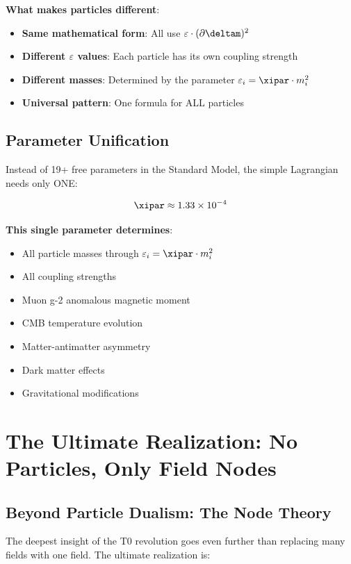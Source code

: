 	\textbf{What makes particles different}:
	\begin{itemize}
		\item \textbf{Same mathematical form}: All use $\varepsilon \cdot (\partial \deltam)^2$
		\item \textbf{Different $\varepsilon$ values}: Each particle has its own coupling strength
		\item \textbf{Different masses}: Determined by the parameter $\varepsilon_i = \xipar \cdot m_i^2$
		\item \textbf{Universal pattern}: One formula for ALL particles
	\end{itemize}
	
	\subsection{Parameter Unification}
	
	Instead of 19+ free parameters in the Standard Model, the simple Lagrangian needs only ONE:
	
	\begin{equation}
		\xipar \approx 1.33 \times 10^{-4}
		\label{eq:universal_parameter}
	\end{equation}
	
	\textbf{This single parameter determines}:
	\begin{itemize}
		\item All particle masses through $\varepsilon_i = \xipar \cdot m_i^2$
		\item All coupling strengths
		\item Muon g-2 anomalous magnetic moment
		\item CMB temperature evolution
		\item Matter-antimatter asymmetry
		\item Dark matter effects
		\item Gravitational modifications
	\end{itemize}
	
	\section{The Ultimate Realization: No Particles, Only Field Nodes}
	
	\subsection{Beyond Particle Dualism: The Node Theory}
	
	The deepest insight of the T0 revolution goes even further than replacing many fields with one field. The ultimate realization is:
	
